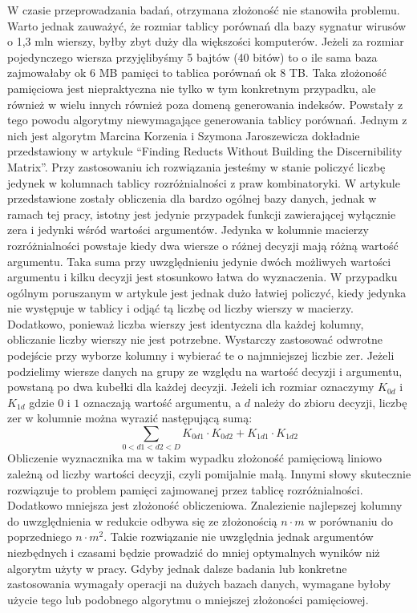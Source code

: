 W czasie przeprowadzania badań, otrzymana złożoność nie stanowiła problemu.
Warto jednak zauważyć, że rozmiar tablicy porównań dla bazy sygnatur wirusów o 1,3 mln wierszy, byłby zbyt duży dla większości komputerów.
Jeżeli za rozmiar pojedynczego wiersza przyjęlibyśmy 5 bajtów (40 bitów) to o ile sama baza zajmowałaby ok 6 MB pamięci to tablica porównań ok 8 TB.
Taka złożoność pamięciowa jest niepraktyczna nie tylko w tym konkretnym przypadku, ale również w wielu innych również poza domeną generowania indeksów.
Powstały z tego powodu algorytmy niewymagające generowania tablicy porównań.
Jednym z nich jest algorytm Marcina Korzenia i Szymona Jaroszewicza dokładnie przedstawiony w artykule “Finding Reducts Without Building the Discernibility Matrix”.
Przy zastosowaniu ich rozwiązania jesteśmy w stanie policzyć liczbę jedynek w kolumnach tablicy rozróżnialności z praw kombinatoryki.
W artykule przedstawione zostały obliczenia dla bardzo ogólnej bazy danych, jednak w ramach tej pracy, istotny jest jedynie przypadek funkcji zawierającej wyłącznie zera i jedynki wśród wartości argumentów.
Jedynka w kolumnie macierzy rozróżnialności powstaje kiedy dwa wiersze o różnej decyzji mają różną wartość argumentu.
Taka suma przy uwzględnieniu jedynie dwóch możliwych wartości argumentu i kilku decyzji jest stosunkowo łatwa do wyznaczenia.
W przypadku ogólnym poruszanym w artykule jest jednak dużo łatwiej policzyć, kiedy jedynka nie występuje w tablicy i odjąć tą liczbę od liczby wierszy w macierzy.
Dodatkowo, ponieważ liczba wierszy jest identyczna dla każdej kolumny, obliczanie liczby wierszy nie jest potrzebne.
Wystarczy zastosować odwrotne podejście przy wyborze kolumny i wybierać te o najmniejszej liczbie zer.
Jeżeli podzielimy wiersze danych na grupy ze względu na wartość decyzji i argumentu, powstaną po dwa kubełki dla każdej decyzji.
Jeżeli ich rozmiar oznaczymy $K_{0d}$ i $K_{1d}$ gdzie $0$ i $1$ oznaczają wartość argumentu, a $d$ należy do zbioru decyzji, liczbę zer w kolumnie można wyrazić następującą sumą:
\begin{equation}
\sum_{0<d1<d2<D} K_{0d1} \cdot K_{0d2} + K_{1d1} \cdot K_{1d2}
\end{equation}
Obliczenie wyznacznika ma w takim wypadku złożoność pamięciową liniowo zależną od liczby wartości decyzji, czyli pomijalnie małą.
Innymi słowy skutecznie rozwiązuje to problem pamięci zajmowanej przez tablicę rozróżnialności.
Dodatkowo mniejsza jest złożoność obliczeniowa.
Znalezienie najlepszej kolumny do uwzględnienia w redukcie odbywa się ze złożonością $n \cdot m$ w porównaniu do poprzedniego $n \cdot m^2$.
Takie rozwiązanie nie uwzględnia jednak argumentów niezbędnych i czasami będzie prowadzić do mniej optymalnych wyników niż algorytm użyty w pracy.
Gdyby jednak dalsze badania lub konkretne zastosowania wymagały operacji na dużych bazach danych, wymagane byłoby użycie tego lub podobnego algorytmu o mniejszej złożoności pamięciowej.

